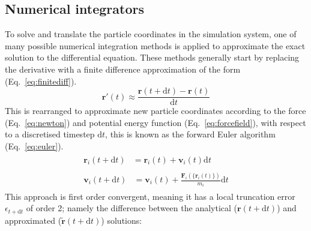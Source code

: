 \subsection{Numerical integrators} \label{sec:integrators}
%
%
To solve  and translate the particle coordinates in the simulation system, one of many possible numerical integration methods is applied to approximate the exact solution to the differential equation. These methods generally start by replacing the derivative with a finite difference approximation of the form (Eq.~\ref{eq:finitediff}). 
%
\begin{equation} \label{eq:finitediff}
    \mathbf{r}'(t) \approx \frac{\mathbf{r}(t+\mathrm{d}t) - \mathbf{r}(t)}{\mathrm{d}t}
\end{equation}
This is rearranged to approximate new particle coordinates according to the force (Eq.~\ref{eq:newton}) and potential energy function (Eq.~\ref{eq:forcefield}), with respect to a discretised timestep $\mathrm{d}t$, this is known as the forward Euler algorithm (Eq.~\ref{eq:euler}).
%
\begin{subequations} \label{eq:euler}
\begin{align}
\begin{split}
    \mathbf{r}_i(t+\mathrm{d}t) &=  \mathbf{r}_i(t) +  \mathbf{v}_i(t)\mathrm{d}t
\end{split}\\
\begin{split}
    \mathbf{v}_i(t+\mathrm{d}t) &=  \mathbf{v}_i(t) + \frac{\mathbf{F}_i(\{\mathbf{r}_i(t)\})}{m_i}\mathrm{d}t
\end{split}
\end{align}
\end{subequations}
%
This approach is first order convergent, meaning it has a local truncation error $\epsilon_{t+\mathrm{d}t}$ of order 2; namely the difference between the analytical ($\mathbf{r}(t+\mathrm{d}t)$) and approximated ($\mathbf{\tilde{r}}(t+\mathrm{d}t)$) solutions:
